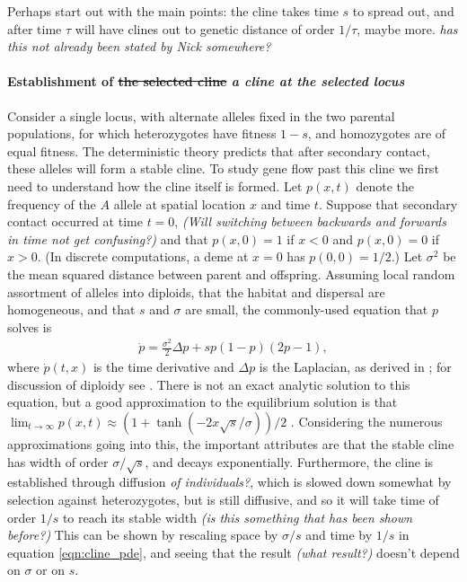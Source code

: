 \documentclass[12pt]{article}
\newcommand{\alisa}[1]{{\em \color{red} #1}}
\begin{document}
Perhaps start out with the main points:
the cline takes time $s$ to spread out,
and after time $\tau$ will have clines out to genetic distance of order $1/\tau$,
maybe more. \alisa{has this not already been stated by Nick somewhere?}

\paragraph{Establishment of  \sout{the selected cline} \alisa{a cline at the selected locus}}
Consider a single locus, with alternate alleles fixed in the two parental populations,
for which heterozygotes have fitness $1-s$, and homozygotes are of equal fitness.
The deterministic theory predicts that after secondary contact,
these alleles will form a stable cline.
To study gene flow past this cline we first need to understand how the cline itself is formed.
Let $p(x,t)$ denote the frequency of the $A$ allele at spatial location $x$ and time $t$.  
Suppose that secondary contact occurred at time $t=0$, \alisa{(Will switching between backwards and forwards in time not get confusing?)}
and that $p(x,0) = 1$ if $x<0$ and $p(x,0)=0$ if $x>0$.
(In discrete computations, a deme at $x=0$ has $p(0,0)=1/2$.)
Let $\sigma^2$ be the mean squared distance between parent and offspring.
Assuming local random assortment of alleles into diploids,
that the habitat and dispersal are homogeneous,
and that $s$ and $\sigma$ are small, 
the commonly-used equation that $p$ solves is
\begin{align} \label{eqn:cline_pde}
    \dot p = \frac{\sigma^2}{2} \Delta p + s p (1-p) (2p-1) ,
\end{align}
where $\dot p(t,x)$ is the time derivative and $\Delta p$ is the Laplacian,
as derived in \citep{bazykin}; for discussion of diploidy see \citep{diploidcline}.
There is not an exact analytic solution to this equation, 
but a good approximation to the equilibrium solution is that
$\lim_{t \to \infty} p(x,t) \approx (1+\tanh(-2x\sqrt{s}/\sigma))/2$ \citep{bazykin}.
Considering the numerous approximations going into this,
the important attributes are that 
the stable cline has width of order $\sigma/\sqrt{s}$,
and decays exponentially.
Furthermore, the cline is established through diffusion \alisa{of individuals?}, which is slowed down somewhat by selection against heterozygotes,
but is still diffusive, and so it will take time of order $1/s$
to reach its stable width \alisa{(is this something that has been shown before?)} This can be shown by rescaling space by $\sigma/s$ and time by $1/s$ in equation \eqref{eqn:cline_pde}, and seeing that the result \alisa{(what result?)} doesn't depend on $\sigma$ or on $s$.
\end{document}
